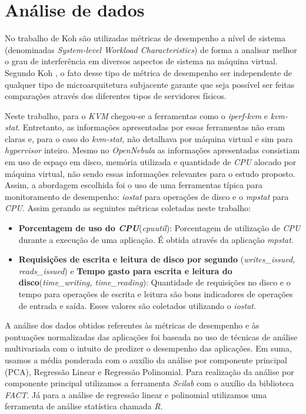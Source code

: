 \section{Análise de dados}
\label{sec:analise-dados}

No trabalho de Koh \cite{koh2007} são utilizadas métricas de desempenho a nível
de sistema (denominadas \textit{System-level Workload Characteristics}) de
forma a analisar melhor o grau de interferência em diversos aspectos de sistema
na máquina virtual. Segundo Koh \cite{koh2007}, o fato desse tipo de métrica de
desempenho ser independente de qualquer tipo de microarquitetura subjacente
garante que seja possível ser feitas comparações através dos diferentes tipos
de servidores físicos.

Neste trabalho, para o \textit{KVM} chegou-se a ferramentas como o
\textit{iperf-kvm} e \textit{kvm-stat}. Entretanto, as informações apresentadas
por essas ferramentas não eram claras e, para o caso do \textit{kvm-stat}, não
detalhava por máquina virtual e sim para  \textit{hypervisor} inteiro. Mesmo no
\textit{OpenNebula} as informações apresentadas consistiam em uso de espaço em
disco, memória utilizada e quantidade de \textit{CPU} alocado por máquina
virtual, não sendo essas informações relevantes para o estudo proposto. Assim,
a abordagem escolhida foi o uso de uma ferramentas típica para monitoramento de
desempenho: \textit{iostat} para operações de disco e o \textit{mpstat} para
\textit{CPU}. Assim gerando as seguintes métricas coletadas neste trabalho:

\begin{itemize}

\item \textbf{Porcentagem de uso do \textit{CPU}}(\textit{cpuutil}):
Porcentagem de utilização de \textit{CPU} durante a execução de uma aplicação.
É obtida através da aplicação \textit{mpstat}.

\item \textbf{Requisições de escrita e leitura de disco por segundo
}(\textit{writes\_issued, reads\_issued}) e \textbf{Tempo gasto para escrita e
leitura do disco}(\textit{time\_writing, time\_reading}): Quantidade de
requisições no disco e o tempo para operações de escrita e leitura são bons
indicadores de operações de entrada e saída. Esses valores são coletados
utilizando o \textit{iostat}.

\end{itemize}

A análise dos dados obtidos referentes às métricas de desempenho e às
pontuações normalizadas das aplicações foi baseada no uso de técnicas de
análise multivariada com o intuito de predizer o desempenho das aplicações. Em
suma, usamos a média ponderada com o auxílio da análise por componente
principal (PCA), Regressão Linear e Regressão Polinomial. Para realização da
análise por componente principal utilizamos a ferramenta \textit{Scilab} com o
auxílio da biblioteca \textit{FACT}. Já para a análise de regressão linear e
polinomial utilizamos uma ferramenta de análise statística chamada \textit{R}.

